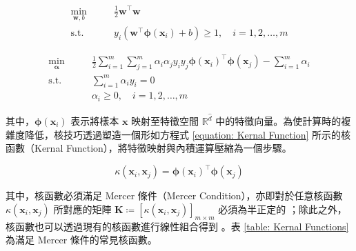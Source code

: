 \begin{equation}\label{equation: Non-Linear SVM Problem}
  \begin{aligned}
    \min_{\boldsymbol{w}, b} \qquad & \frac{1}{2} \boldsymbol{w}^{\top} \boldsymbol{w} \\
    \text{s.t.}              \qquad & y_{i} (\boldsymbol{w}^{\top} \boldsymbol{\phi} (\boldsymbol{x}_{i}) + b ) \geq 1 ,\quad i = 1, 2, \ldots, m
  \end{aligned}
\end{equation}

\begin{equation}\label{equation: Non-Linear Dual SVM Problem}
  \begin{aligned}
    \min_{\boldsymbol{\alpha}} \qquad & \frac{1}{2} \sum_{i = 1}^{m} \sum_{j = 1}^{m} \alpha_i \alpha_j y_i y_j \boldsymbol{\phi} (\boldsymbol{x}_{i})^{\top} \boldsymbol{\phi} (\boldsymbol{x}_{j}) - \sum_{i = 1}^{m} \alpha_{i} \\
    \text{s.t.}                \qquad & \sum_{i = 1}^{m} \alpha_{i} y_{i} = 0 \\
                               \qquad & \alpha_{i} \geq 0 ,\quad i = 1, 2, \ldots, m
  \end{aligned}
\end{equation}

其中，$\boldsymbol{\phi} (\boldsymbol{x}_{i})$ 表示將樣本 $\boldsymbol{x}$ 映射至特徵空間 $\mathbb{R}^{\hat{d}}$ 中的特徵向量。為使計算時的複雜度降低，核技巧透過塑造一個形如方程式 \eqref{equation: Kernal Function} 所示的核函數（Kernal Function），將特徵映射與內積運算壓縮為一個步驟。

\begin{equation}\label{equation: Kernal Function}
  \kappa (\boldsymbol{x}_{i}, \boldsymbol{x}_{j}) = \boldsymbol{\phi} (\boldsymbol{x}_{i})^{\top} \boldsymbol{\phi} (\boldsymbol{x}_{j})
\end{equation}

其中，核函數必須滿足 Mercer 條件（Mercer Condition），亦即對於任意核函數 $\kappa (\boldsymbol{x}_{i}, \boldsymbol{x}_{j})$ 所對應的矩陣 $\boldsymbol{K} \coloneqq [\kappa (\boldsymbol{x}_{i}, \boldsymbol{x}_{j})]_{m \times m} $ 必須為半正定的 \cite{cristianini2000introduction}；除此之外，核函數也可以透過現有的核函數進行線性組合得到 \cite{lanckriet2004learning}。表 \ref{table: Kernal Functions} 為滿足 Mercer 條件的常見核函數。

